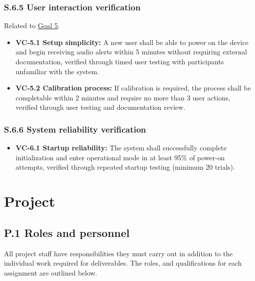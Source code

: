 \documentclass[12pt]{article}
\theoremstyle{definition}
\begin{document}
\subsubsection{S.6.5 User interaction verification}

Related to \hyperref[goal:user_friendly_interaction]{Goal 5}.

\begin{itemize}
\item \textbf{VC-5.1 Setup simplicity:} A new user shall be able to power on 
the device and begin receiving audio alerts within 5 minutes without requiring 
external documentation, verified through timed user testing with participants 
unfamiliar with the system.

\item \textbf{VC-5.2 Calibration process:} If calibration is required, the 
process shall be completable within 2 minutes and require no more than 3 
user actions, verified through user testing and documentation review.
\end{itemize}

\subsubsection{S.6.6 System reliability verification}

\begin{itemize}
\item \textbf{VC-6.1 Startup reliability:} The system shall successfully 
complete initialization and enter operational mode in at least 95\% of power-on 
attempts, verified through repeated startup testing (minimum 20 trials).
\end{itemize}



\section{Project}

\subsection{P.1 Roles and personnel}\label{item: p1}

All project staff have responsibilities they must carry out in addition to the
 individual work required for deliverables. 
The roles, and qualifications for each assignment are outlined below. 
\end{document}
